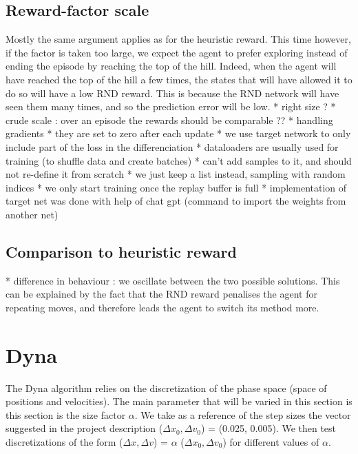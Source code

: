 \documentclass[a4paper, 12pt,oneside]{article}
\begin{document}
            \subsection{Reward-factor scale}
            Mostly the same argument applies as for the heuristic reward. This time however, if the factor is taken too large, we expect the agent to prefer exploring instead of ending the episode by reaching the top of the hill. Indeed, when the agent will have reached the top of the hill a few times, the states that will have allowed it to do so will have a low RND reward. This is because the RND network will have seen them many times, and so the prediction error will be low.
            * right size ?
            * crude scale : over an episode the rewards should be comparable ?? 
            * handling gradients 
            * they are set to zero after each update
            * we use target network to only include part of the loss in the differenciation 
          * dataloaders are usually used for training (to shuffle data and create batches)
            * can't add samples to it, and should not re-define it from scratch 
              * we just keep a list instead, sampling with random indices 
          * we only start training once the replay buffer is full 
          * implementation of target net was done with help of chat gpt (command to import the weights from another net)
        \subsection{Comparison to heuristic reward}
        * difference in behaviour : we oscillate between the two possible solutions. This can be explained by the fact that the RND reward penalises the agent for repeating moves, and therefore leads the agent to switch its method more. 
    \section{Dyna}
        The Dyna algorithm relies on the discretization of the phase space (space of positions and velocities).
        The main parameter that will be varied in this section is this section is the size factor $\alpha$. We take as a reference of the step sizes the vector suggested in the project description ($\Delta x_0, \Delta v_0$) = (0.025, 0.005). We then test discretizations of the form ($\Delta x, \Delta v$) = $\alpha$ ($\Delta x_0, \Delta v_0$) 
        for different values of $\alpha$.
\end{document}

